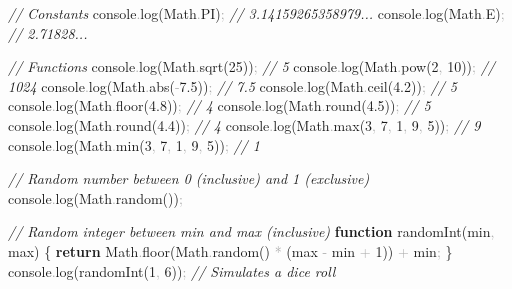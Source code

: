 \documentclass[
  justified,
  openright,
]{tufte-book}
\newcommand{\KeywordTok}[1]{\textcolor{CodeKeyword}{\textbf{#1}}}  %
\newcommand{\CommentTok}[1]{\textcolor{CodeComment}{\textit{#1}}}  %
\newcommand{\CodeNumTok}[1]{\textcolor{CodeNumber}{#1}}             %
\newcommand{\CodeFuncTok}[1]{\textcolor{CodeKeyword}{#1}}           %
\newcommand{\OperatorTok}[1]{\textcolor{DarkGray}{#1}}              %
\newenvironment{Shaded}{%
  \begin{mdframed}[style=TufteCode]%
}{%
  \end{mdframed}%
}
\begin{document}
\begin{Shaded}
\begin{Highlighting}[]
\CommentTok{// Constants}
console\OperatorTok{.}\CodeFuncTok{log}(Math\OperatorTok{.}\CodeNumTok{PI})\OperatorTok{;} \CommentTok{// 3.14159265358979...}
console\OperatorTok{.}\CodeFuncTok{log}(Math\OperatorTok{.}\CodeNumTok{E})\OperatorTok{;} \CommentTok{// 2.71828...}
 
\CommentTok{// Functions}
console\OperatorTok{.}\CodeFuncTok{log}(Math\OperatorTok{.}\CodeFuncTok{sqrt}(\CodeNumTok{25}))\OperatorTok{;} \CommentTok{// 5}
console\OperatorTok{.}\CodeFuncTok{log}(Math\OperatorTok{.}\CodeFuncTok{pow}(\CodeNumTok{2}\OperatorTok{,} \CodeNumTok{10}))\OperatorTok{;} \CommentTok{// 1024}
console\OperatorTok{.}\CodeFuncTok{log}(Math\OperatorTok{.}\CodeFuncTok{abs}(\OperatorTok{{-}}\CodeNumTok{7.5}))\OperatorTok{;} \CommentTok{// 7.5}
console\OperatorTok{.}\CodeFuncTok{log}(Math\OperatorTok{.}\CodeFuncTok{ceil}(\CodeNumTok{4.2}))\OperatorTok{;} \CommentTok{// 5}
console\OperatorTok{.}\CodeFuncTok{log}(Math\OperatorTok{.}\CodeFuncTok{floor}(\CodeNumTok{4.8}))\OperatorTok{;} \CommentTok{// 4}
console\OperatorTok{.}\CodeFuncTok{log}(Math\OperatorTok{.}\CodeFuncTok{round}(\CodeNumTok{4.5}))\OperatorTok{;} \CommentTok{// 5}
console\OperatorTok{.}\CodeFuncTok{log}(Math\OperatorTok{.}\CodeFuncTok{round}(\CodeNumTok{4.4}))\OperatorTok{;} \CommentTok{// 4}
console\OperatorTok{.}\CodeFuncTok{log}(Math\OperatorTok{.}\CodeFuncTok{max}(\CodeNumTok{3}\OperatorTok{,} \CodeNumTok{7}\OperatorTok{,} \CodeNumTok{1}\OperatorTok{,} \CodeNumTok{9}\OperatorTok{,} \CodeNumTok{5}))\OperatorTok{;} \CommentTok{// 9}
console\OperatorTok{.}\CodeFuncTok{log}(Math\OperatorTok{.}\CodeFuncTok{min}(\CodeNumTok{3}\OperatorTok{,} \CodeNumTok{7}\OperatorTok{,} \CodeNumTok{1}\OperatorTok{,} \CodeNumTok{9}\OperatorTok{,} \CodeNumTok{5}))\OperatorTok{;} \CommentTok{// 1}
 
\CommentTok{// Random number between 0 (inclusive) and 1 (exclusive)}
console\OperatorTok{.}\CodeFuncTok{log}(Math\OperatorTok{.}\CodeFuncTok{random}())\OperatorTok{;}
 
\CommentTok{// Random integer between min and max (inclusive)}
\KeywordTok{function} \CodeFuncTok{randomInt}(min\OperatorTok{,} max) \{
  \KeywordTok{return} Math\OperatorTok{.}\CodeFuncTok{floor}(Math\OperatorTok{.}\CodeFuncTok{random}() \OperatorTok{*} (max \OperatorTok{{-}} min \OperatorTok{+} \CodeNumTok{1})) \OperatorTok{+} min\OperatorTok{;}
\}
console\OperatorTok{.}\CodeFuncTok{log}(\CodeFuncTok{randomInt}(\CodeNumTok{1}\OperatorTok{,} \CodeNumTok{6}))\OperatorTok{;} \CommentTok{// Simulates a dice roll}
\end{Highlighting}
\end{Shaded}
\end{document}
